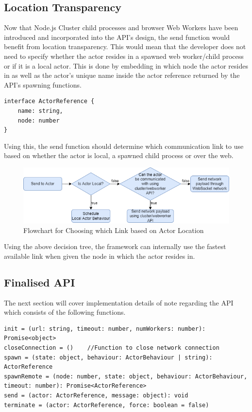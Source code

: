 \documentclass[12pt, a4paper]{report}
\theoremstyle{definition}
\theoremstyle{definition}%
\theoremstyle{definition}%
\theoremstyle{definition}%
\theoremstyle{definition}%
\theoremstyle{definition}%
\begin{document}
\subsection{Location Transparency}
Now that Node.js Cluster child processes and browser Web Workers have been introduced and incorporated into the API’s design, the send function would benefit from location transparency. This would mean that the developer does not need to specify whether the actor resides in a spawned web worker/child process or if it is a local actor. This is done by embedding in which node the actor resides in as well as the actor's unique name inside the actor reference returned by the API’s spawning functions.
\begin{lstlisting}
interface ActorReference {
    name: string,
    node: number
}
\end{lstlisting}
Using this, the send function should determine which communication link to use based on whether the actor is local, a spawned child process or over the web.
\begin{figure}[H]
    \begin{centering}
        \includegraphics[width=\textwidth]{resources/communication.png}
        \caption{Flowchart for Choosing which Link based on Actor Location}
    \end{centering}
\end{figure}
Using the above decision tree, the framework can internally use the fastest available link when given the node in which the actor resides in.
\subsection{Finalised API}
The next section will cover implementation details of note regarding the API which consists of the following functions.
\begin{lstlisting}
init = (url: string, timeout: number, numWorkers: number): Promise<object>
closeConnection = ()    //Function to close network connection
spawn = (state: object, behaviour: ActorBehaviour | string): ActorReference
spawnRemote = (node: number, state: object, behaviour: ActorBehaviour, timeout: number): Promise<ActorReference>
send = (actor: ActorReference, message: object): void
terminate = (actor: ActorReference, force: boolean = false)
\end{lstlisting}
\end{document}
